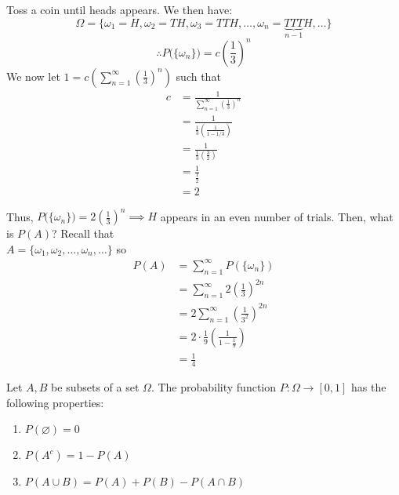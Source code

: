 \documentclass{article}
\begin{document}
	\begin{exmp}
		Toss a coin until heads appears. We then have:
		$$ \Omega = \{ \omega_1 = H, \omega_2 = TH, \omega_3 = TTH, \dots, \omega_n = \underbrace{TTT}_{n-1}H, \dots \}$$
		$$ \therefore P \big( \{ \omega_n \} \big) = c \left( \frac{1}{3}\right)^n$$
		We now let $1 = c \left( \sum_{n=1}^\infty \left( \frac13\right)^n \right)$ such that
		\begin{align*}
			c &= \frac{1}{\sum_{n=1}^\infty \left( \frac13 \right)^n} \\
			&= \frac{1}{\frac{1}{3} \left( \frac{1}{1-1/3} \right)} \\
			&= \frac{1}{\frac{1}{3} \left( \frac{3}{2} \right)} \\
			&= \frac{1}{\frac12}\\
			&= 2
		\end{align*}
\pagebreak

		Thus, $P \big( \{ \omega_n \} \big) = 2 \left(\frac{1}{3}\right)^n \implies H$ appears in an even number of trials. Then, what is $P(A)$? Recall that \\ $A = \{ \omega_1, \omega_2, \dots, \omega_n, \dots\} $ so \\
		\vspace{-1cm}
		\begin{align*}
			P(A) &= \sum_{n=1}^\infty P \left( \{ \omega_n \} \right) \\
			&= \sum_{n=1}^\infty 2 \left( \frac13 \right)^{2n} \\
			&= 2 \sum_{n=1}^\infty \left( \frac{1}{3^2} \right)^{2n} \\
			&= 2 \cdot \frac19 \left( \frac{1}{1-\frac{1}{9}}\right) \\
			&= \frac14
		\end{align*}
	\end{exmp}
	\begin{thm}
		Let $A, B$ be subsets of a set $\Omega$. The probability function $P: \Omega \to [0,1]$ has the following properties:
		\begin{enumerate}
			\item $P(\varnothing) = 0$ 
			\item $P(A^c) = 1 - P(A)$
			\item $P(A \cup B) =  P(A) + P(B) - P(A \cap B)$
		\end{enumerate}
	\end{thm}
\end{document}
